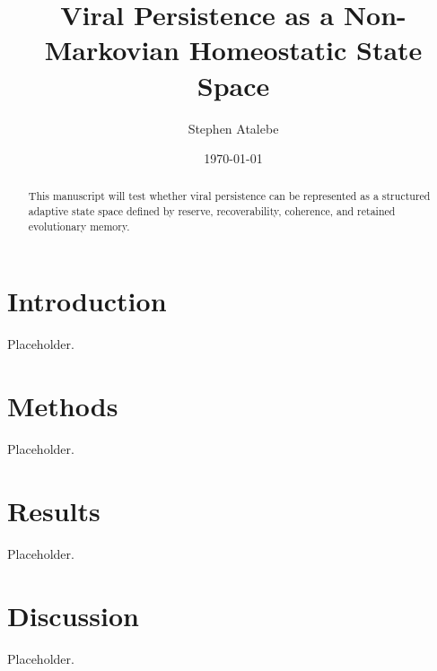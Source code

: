 \documentclass[11pt]{article}
\title{Viral Persistence as a Non-Markovian Homeostatic State Space}
\author{Stephen Atalebe}
\date{\today}
\begin{document}
\maketitle

\begin{abstract}
This manuscript will test whether viral persistence can be represented as a structured adaptive state space defined by reserve, recoverability, coherence, and retained evolutionary memory.
\end{abstract}

\section{Introduction}

Placeholder.

\section{Methods}

Placeholder.

\section{Results}

Placeholder.

\section{Discussion}

Placeholder.
\end{document}
